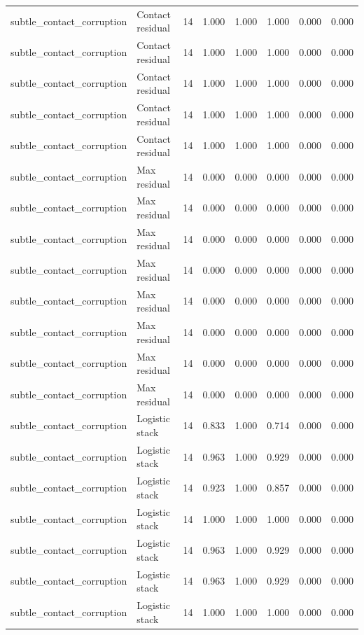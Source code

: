 {\begin{longtable}{llrrrrrr}
subtle\_contact\_corruption & Contact residual & 14 & 1.000 & 1.000 & 1.000 & 0.000 & 0.000 \\
subtle\_contact\_corruption & Contact residual & 14 & 1.000 & 1.000 & 1.000 & 0.000 & 0.000 \\
subtle\_contact\_corruption & Contact residual & 14 & 1.000 & 1.000 & 1.000 & 0.000 & 0.000 \\
subtle\_contact\_corruption & Contact residual & 14 & 1.000 & 1.000 & 1.000 & 0.000 & 0.000 \\
subtle\_contact\_corruption & Contact residual & 14 & 1.000 & 1.000 & 1.000 & 0.000 & 0.000 \\
subtle\_contact\_corruption & Max residual & 14 & 0.000 & 0.000 & 0.000 & 0.000 & 0.000 \\
subtle\_contact\_corruption & Max residual & 14 & 0.000 & 0.000 & 0.000 & 0.000 & 0.000 \\
subtle\_contact\_corruption & Max residual & 14 & 0.000 & 0.000 & 0.000 & 0.000 & 0.000 \\
subtle\_contact\_corruption & Max residual & 14 & 0.000 & 0.000 & 0.000 & 0.000 & 0.000 \\
subtle\_contact\_corruption & Max residual & 14 & 0.000 & 0.000 & 0.000 & 0.000 & 0.000 \\
subtle\_contact\_corruption & Max residual & 14 & 0.000 & 0.000 & 0.000 & 0.000 & 0.000 \\
subtle\_contact\_corruption & Max residual & 14 & 0.000 & 0.000 & 0.000 & 0.000 & 0.000 \\
subtle\_contact\_corruption & Max residual & 14 & 0.000 & 0.000 & 0.000 & 0.000 & 0.000 \\
subtle\_contact\_corruption & Logistic stack & 14 & 0.833 & 1.000 & 0.714 & 0.000 & 0.000 \\
subtle\_contact\_corruption & Logistic stack & 14 & 0.963 & 1.000 & 0.929 & 0.000 & 0.000 \\
subtle\_contact\_corruption & Logistic stack & 14 & 0.923 & 1.000 & 0.857 & 0.000 & 0.000 \\
subtle\_contact\_corruption & Logistic stack & 14 & 1.000 & 1.000 & 1.000 & 0.000 & 0.000 \\
subtle\_contact\_corruption & Logistic stack & 14 & 0.963 & 1.000 & 0.929 & 0.000 & 0.000 \\
subtle\_contact\_corruption & Logistic stack & 14 & 0.963 & 1.000 & 0.929 & 0.000 & 0.000 \\
subtle\_contact\_corruption & Logistic stack & 14 & 1.000 & 1.000 & 1.000 & 0.000 & 0.000 \\

\end{longtable}}
